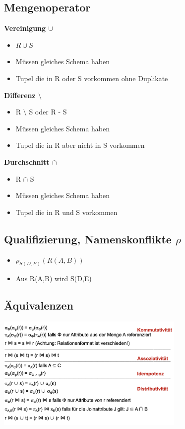 \documentclass[8pt,a4paper]{scrartcl}
\begin{document}
\begin{multicols*}{3}
			\subsection{Mengenoperator}
				\textbf{Vereinigung $\cup$}
				\begin{itemize}\itemsep0pt			
					\item  $R \cup S$
					\item Müssen gleiches Schema haben
					\item Tupel die in R oder S vorkommen ohne Duplikate
				\end{itemize}
				
				\textbf{Differenz $\setminus$}
				\begin{itemize}\itemsep0pt		
					\item R $\setminus$ S oder R - S
					\item Müssen gleiches Schema haben
					\item Tupel die in R aber nicht in S vorkommen
				\end{itemize}
				
				\textbf{Durchschnitt $\cap$}
				\begin{itemize}\itemsep0pt		
					\item R $\cap$ S
					\item Müssen gleiches Schema haben
					\item Tupel die in R und S vorkommen
				\end{itemize}
				
			\subsection{Qualifizierung, Namenskonflikte $\rho$}
				\begin{itemize}\itemsep0pt			
					\item  $\rho_{S(D,E)}(R(A,B))$
					\item Aus R(A,B) wird S(D,E)
				\end{itemize}
			
				
			\subsection{Äquivalenzen}
				\includegraphics[height=5.5cm]{img/aequivalenzen.png}
				

\end{multicols*}
\end{document}
